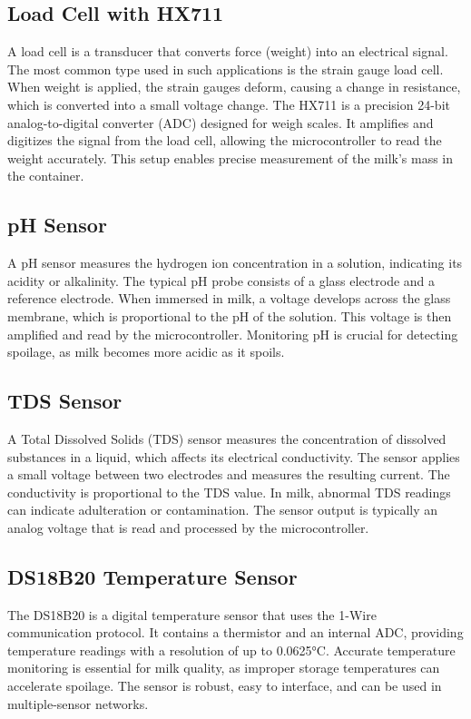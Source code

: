 \documentclass[12pt,a4paper]{article}
\begin{document}
\subsection{Load Cell with HX711}
A load cell is a transducer that converts force (weight) into an electrical signal. The most common type used in such applications is the strain gauge load cell. When weight is applied, the strain gauges deform, causing a change in resistance, which is converted into a small voltage change. The HX711 is a precision 24-bit analog-to-digital converter (ADC) designed for weigh scales. It amplifies and digitizes the signal from the load cell, allowing the microcontroller to read the weight accurately. This setup enables precise measurement of the milk's mass in the container.

\subsection{pH Sensor}
A pH sensor measures the hydrogen ion concentration in a solution, indicating its acidity or alkalinity. The typical pH probe consists of a glass electrode and a reference electrode. When immersed in milk, a voltage develops across the glass membrane, which is proportional to the pH of the solution. This voltage is then amplified and read by the microcontroller. Monitoring pH is crucial for detecting spoilage, as milk becomes more acidic as it spoils.

\subsection{TDS Sensor}
A Total Dissolved Solids (TDS) sensor measures the concentration of dissolved substances in a liquid, which affects its electrical conductivity. The sensor applies a small voltage between two electrodes and measures the resulting current. The conductivity is proportional to the TDS value. In milk, abnormal TDS readings can indicate adulteration or contamination. The sensor output is typically an analog voltage that is read and processed by the microcontroller.

\subsection{DS18B20 Temperature Sensor}
The DS18B20 is a digital temperature sensor that uses the 1-Wire communication protocol. It contains a thermistor and an internal ADC, providing temperature readings with a resolution of up to 0.0625°C. Accurate temperature monitoring is essential for milk quality, as improper storage temperatures can accelerate spoilage. The sensor is robust, easy to interface, and can be used in multiple-sensor networks.
\end{document}

